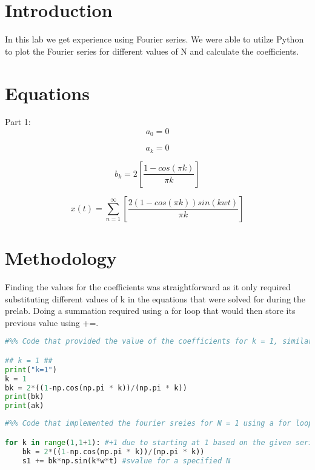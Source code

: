 \documentclass[12pt]{report}
\begin{document}
\section{Introduction}
 

In this lab we get experience using Fourier series. We were able to utilze Python to plot the Fourier series for different values of N and calculate the coefficients. 

\section{Equations}
Part 1:
\begin{equation*}
a_0 = 0
\end{equation*}

\begin{equation*}
a_k = 0
\end{equation*}


\begin{equation*}
b_k = 2[\frac{1-cos(\pi k)}{\pi k}] 
\end{equation*}

\begin{equation*}
x(t) = \sum_{n=1}^{\infty} [\frac{2(1-cos(\pi k))sin(kwt)}{\pi k}]
\end{equation*}


\section{Methodology}

Finding the values for the coefficients was straightforward as it only required substituting different values of k in the equations that were solved for during the prelab. Doing a summation required using a for loop that would then store its previous value using +=. 

\begin{lstlisting}[language=Python]
#%% Code that provided the value of the coefficients for k = 1, similar format with k = 2 and k = 3. Did not supply the a coefficient equation since it did not rely on k so it would have been redundant to have it calculate it for each k value. 

## k = 1 ##
print("k=1")
k = 1
bk = 2*((1-np.cos(np.pi * k))/(np.pi * k))
print(bk)
print(ak)

\end{lstlisting}

\begin{lstlisting}[language=Python]
#%% Code that implemented the fourier sreies for N = 1 using a for loop and a and add assignment operator. This is repeated for different N values with the same format. Starts at 1 due to the first term of the Fourier series being at one thus in order for N to be 1 it requires adding 1. 

for k in range(1,1+1): #+1 due to starting at 1 based on the given series
    bk = 2*((1-np.cos(np.pi * k))/(np.pi * k))
    s1 += bk*np.sin(k*w*t) #svalue for a specified N

\end{lstlisting}
\end{document}
